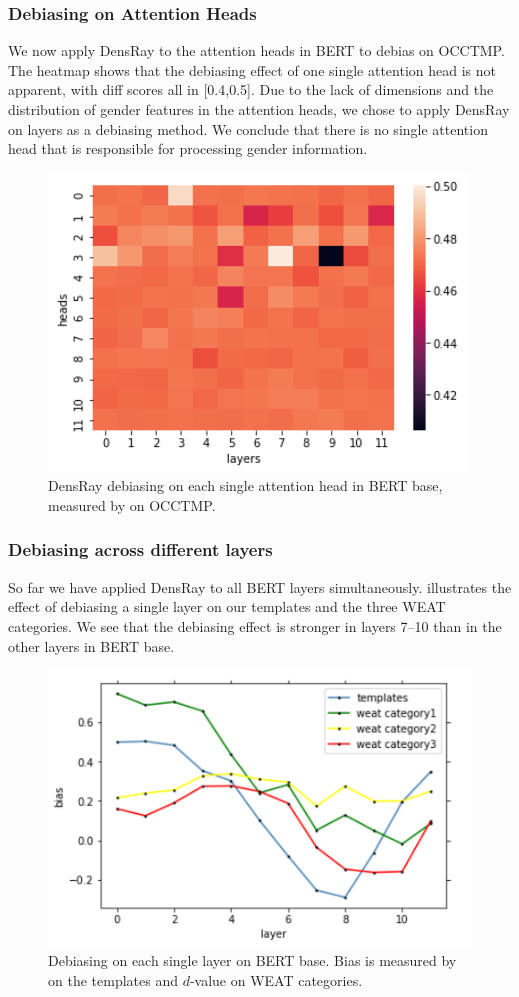 \subsubsection{Debiasing on Attention Heads}
We now apply DensRay to the attention heads in BERT to debias on OCCTMP. The heatmap  shows that the debiasing effect of one single attention head is not apparent, with diff scores all in [0.4,0.5]. Due to the lack of dimensions and the distribution of gender features in the attention heads, we chose to apply DensRay on layers as a debiasing method.  We conclude that there is no single attention head that is responsible for processing gender information.
\begin{figure}[h]
	\centering
	\includegraphics[width=0.5\linewidth]{heatmap_heads}
	\caption{DensRay debiasing on each single attention head in BERT base, measured by  on OCCTMP.}
\end{figure}

\subsubsection{Debiasing across different layers}
So far we have applied DensRay to all BERT layers simultaneously.
    illustrates the effect of
 debiasing a single  layer on our templates and the three
 WEAT categories. We see that the debiasing effect
is stronger in
layers 7--10  than in the other layers in BERT base.
\begin{figure}[h]
	\centering
	\includegraphics[width=0.5\linewidth]{layers_base}
	\caption{Debiasing on each single layer on BERT base. Bias is measured by  on the templates and $d$-value on WEAT categories.}
\end{figure}
